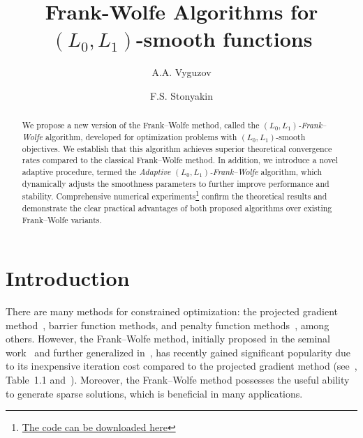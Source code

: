 \documentclass[runningheads]{llncs}
\begin{document}
	
	\title{Frank-Wolfe Algorithms for $(L_0, L_1)$-smooth functions}
	
	\author{
		A.A. Vyguzov \and
		F.S. Stonyakin
	}
	
	
	
	\maketitle
	
	\begin{abstract}
		We propose a new version of the Frank--Wolfe method, called the \emph{$(L_0,L_1)$-Frank--Wolfe} algorithm, developed for optimization problems with $(L_0,L_1)$-smooth objectives. We establish that this algorithm achieves superior theoretical convergence rates compared to the classical Frank--Wolfe method. In addition, we introduce a novel adaptive procedure, termed the \emph{Adaptive $(L_0,L_1)$-Frank--Wolfe} algorithm, which dynamically adjusts the smoothness parameters to further improve performance and stability. Comprehensive numerical experiments\footnote{\href{https://github.com/DredderGun/l0_l1_smooth_amd_fw_article}{The code can be downloaded here}} confirm the theoretical results and demonstrate the clear practical advantages of both proposed algorithms over existing Frank--Wolfe variants.
		
	\end{abstract}
	
	\section{Introduction}
	
	There are many methods for constrained optimization: the projected gradient method~\cite{polyak1983introduction}, barrier function methods, and penalty function methods~\cite{boyd2004convex,nesterov2018lectures}, among others. However, the Frank--Wolfe method, initially proposed in the seminal work~\cite{frank1956algorithm} and further generalized in~\cite{levitin1966constrained}, has recently gained significant popularity due to its inexpensive iteration cost compared to the projected gradient method (see~\cite{braun2022conditional}, Table~1.1 and~\cite{combettes2021complexity}). Moreover, the Frank--Wolfe method possesses the useful ability to generate sparse solutions, which is beneficial in many applications.
	
\end{document}
